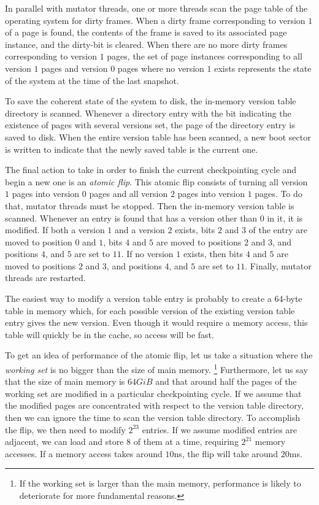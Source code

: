 In parallel with mutator threads, one or more threads scan the page
table of the operating system for dirty frames.  When a dirty frame
corresponding to version $1$ of a page is found, the contents of the
frame is saved to its associated page instance, and the dirty-bit is
cleared.  When there are no more dirty frames corresponding to version
$1$ pages, the set of page instances corresponding to all version $1$
pages and version $0$ pages where no version $1$ exists represents the
state of the system at the time of the last snapshot.

To save the coherent state of the system to disk, the in-memory
version table directory is scanned.  Whenever a directory entry with
the bit indicating the existence of pages with several versions set,
the page of the directory entry is saved to disk.  When the entire
version table has been scanned, a new boot sector is written
to indicate that the newly saved table is the current one.

The final action to take in order to finish the current checkpointing
cycle and begin a new one is an \emph{atomic flip}.  This atomic flip
consists of turning all version $1$ pages into version $0$ pages and
all version $2$ pages into version $1$ pages.  To do that, mutator
threads must be stopped.  Then the in-memory version table is scanned.
Whenever an entry is found that has a version other than $0$ in it, it
is modified.  If both a version $1$ and a version $2$ exists, bits $2$
and $3$ of the entry are moved to position $0$ and $1$, bits $4$ and
$5$ are moved to positions $2$ and $3$, and positions $4$, and $5$ are
set to $11$.  If no version $1$ exists, then bits $4$ and $5$ are
moved to positions $2$ and $3$, and positions $4$, and $5$ are set to
$11$.  Finally, mutator threads are restarted.

The easiest way to modify a version table entry is probably to create
a 64-byte table in memory which, for each possible version of the
existing version table entry gives the new version.  Even though it
would require a memory access, this table will quickly be in the
cache, so access will be fast.

To get an idea of performance of the atomic flip, let us take a
situation where the \emph{working set} is no bigger than the size of
main memory.%
\footnote{If the working set is larger than the main memory,
  performance is likely to deteriorate for more fundamental reasons.}
Furthermore, let us say that the size of main memory is $64GiB$ and
that around half the pages of the working set are modified in a
particular checkpointing cycle.  If we assume that the modified pages
are concentrated with respect to the version table directory, then we
can ignore the time to scan the version table directory.  To
accomplish the flip, we then need to modify $2^{23}$ entries.  If we
assume modified entries are adjacent, we can load and store $8$ of
them at a time, requiring $2^{21}$ memory accesses.  If a memory
access takes around $10$ns, the flip will take around $20$ms.

